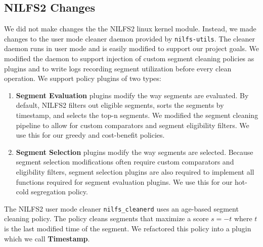 \documentclass[12pt]{article}
\begin{document}
\subsection{NILFS2 Changes}
We did not make changes the the NILFS2 linux kernel module. Instead, we made changes to the user mode cleaner daemon provided by \verb|nilfs-utils|. The cleaner daemon runs in user mode and is easily modified to support our project goals. We modified the daemon to support injection of custom segment cleaning policies as plugins and to write logs recording segment utilization before every clean operation. We support policy plugins of two types: 
\begin{enumerate}
    \item \textbf{Segment Evaluation} plugins modify the way segments are evaluated. By default, NILFS2 filters out eligible segments, sorts the segments by timestamp, and selects the top-n segments. We modified the segment cleaning pipeline to allow for custom comparators and segment eligibility filters. We use this for our greedy and cost-benefit policies. 
    \item \textbf{Segment Selection} plugins modify the way segments are selected. Because segment selection modifications often require custom comparators and eligibility filters, segment selection plugins are also required to implement all functions required for segment evaluation plugins. We use this for our hot-cold segregation policy. 
\end{enumerate}

The NILFS2 user mode cleaner \verb|nilfs_cleanerd| uses an age-based segment cleaning policy. The policy cleans segments that maximize a score $s=-t$ where $t$ is the last modified time of the segment. We refactored this policy into a plugin which we call \textbf{Timestamp}. 
\end{document}
